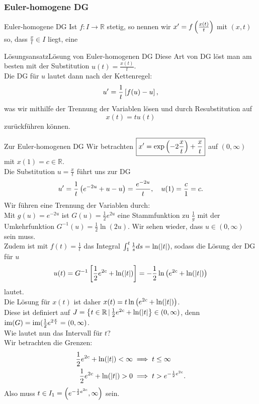 \subsubsection{Euler-homogene DG}
\begin{Def}
{Euler-homogene DG}
Ist $f:I\to\mathbb{R}$ stetig, so nennen wir $x'=f\left({\frac{x(t)}{t}}\right)$ mit $(x,t)$ so, dass $\frac{x}{t}\in I$ liegt, eine 
\end{Def}
\begin{Satz}
{Lösungsansatz}{Lösung von Euler-homogenen DG}
Diese Art von DG löst man am besten mit der Substitution $u(t)=\frac{x(t)}{t}$.\\
Die DG für $u$ lautet dann nach der Kettenregel:
\begin{equation*}
    u'=\frac{1}{t}\left[{f(u)-u}\right],
\end{equation*}
was wir mithilfe der Trennung der Variablen lösen und durch Resubstitution auf
\begin{equation*}
    x(t)=t u(t)
\end{equation*}
zurückführen können.
\end{Satz}
\begin{Beispiel}
{Zur Euler-homogenen DG}
Wir betrachten $\boxed{x'=\exp\left({-2\frac{x}{t}}\right)+\frac{x}{t}}$ auf $(0,\infty)$ mit $x(1)=c\in\mathbb{R}$.\\
Die Substitution $u=\frac{x}{t}$ führt uns zur DG
\begin{equation*}
    u'=\frac{1}{t}\left({e^{-2u}+u-u}\right)=\frac{e^{-2u}}{t},\quad u(1)=\frac{c}{1}=c.
\end{equation*}
Wir führen eine Trennung der Variablen durch:\\
Mit $g(u)=e^{-2u}$ ist $G(u)=\frac{1}{2}e^{2u}$ eine Stammfunktion zu $\frac{1}{g}$ mit der Umkehrfunktion $G^{-1}(u)=\frac{1}{2}\ln(2u)$. Wir sehen wieder, dass $u\in(0,\infty)$ sein muss.\\
Zudem ist mit $f(t)=\frac{1}{t}$ das Integral $\int_1^t\frac{1}{s}ds=\ln(\left|{t}\right|)$, sodass die Lösung der DG für $u$
\begin{equation*}
    u(t)=G^{-1}\left[{\frac{1}{2}e^{2c}+\ln(\left|{t}\right|)}\right]=-\frac{1}{2}\ln\left({e^{2c}+\ln(\left|{t}\right|)}\right)
\end{equation*}
lautet.\\
Die Lösung für $x(t)$ ist daher $x(t)=t\ln\left({e^{2c}+\ln(\left|{t}\right|)}\right)$.\\
Diese ist definiert auf $J=\left\{t\in\mathbb{R}\,|\,\frac{1}{2}e^{2c}+\ln(\left|{t}\right|\right\}\in(0,\infty)$, denn $\text{im}(G)=\text{im}(\frac{1}{2}e^{2\frac{x}{t}}=(0,\infty)$.\\
Wie lautet nun das Intervall für $t$?\\
Wir betrachten die Grenzen:
\begin{align*}
    \frac{1}{2}e^{2c}+\ln(\left|{t}\right|)<\infty&\implies t\leq \infty\\
    \frac{1}{2}e^{2c}+\ln(\left|{t}\right|)>0&\implies t>e^{-\frac{1}{2}e^{2c}}.
\end{align*}
Also muss $t\in I_1=\left({e^{-\frac{1}{2}e^{2c}},\infty}\right)$ sein.
\end{Beispiel}

